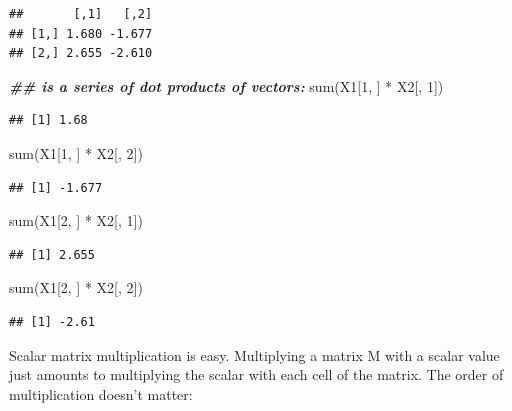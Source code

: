 \documentclass[
  12pt,
]{krantz}
\newenvironment{Shaded}{\begin{snugshade}}{\end{snugshade}}
\newcommand{\DecValTok}[1]{\textcolor[rgb]{0.00,0.00,0.81}{#1}}
\newcommand{\DocumentationTok}[1]{\textcolor[rgb]{0.56,0.35,0.01}{\textbf{\textit{#1}}}}
\newcommand{\FunctionTok}[1]{\textcolor[rgb]{0.00,0.00,0.00}{#1}}
\newcommand{\NormalTok}[1]{#1}
\newcommand{\SpecialCharTok}[1]{\textcolor[rgb]{0.00,0.00,0.00}{#1}}
\theoremstyle{definition}
\theoremstyle{definition}
\theoremstyle{definition}
\theoremstyle{definition}
\theoremstyle{remark}
\begin{document}
\begin{verbatim}
##       [,1]   [,2]
## [1,] 1.680 -1.677
## [2,] 2.655 -2.610
\end{verbatim}

\begin{Shaded}
\begin{Highlighting}[]
\DocumentationTok{\#\# is a series of dot products of vectors:}
\FunctionTok{sum}\NormalTok{(X1[}\DecValTok{1}\NormalTok{, ] }\SpecialCharTok{*}\NormalTok{ X2[, }\DecValTok{1}\NormalTok{])}
\end{Highlighting}
\end{Shaded}

\begin{verbatim}
## [1] 1.68
\end{verbatim}

\begin{Shaded}
\begin{Highlighting}[]
\FunctionTok{sum}\NormalTok{(X1[}\DecValTok{1}\NormalTok{, ] }\SpecialCharTok{*}\NormalTok{ X2[, }\DecValTok{2}\NormalTok{])}
\end{Highlighting}
\end{Shaded}

\begin{verbatim}
## [1] -1.677
\end{verbatim}

\begin{Shaded}
\begin{Highlighting}[]
\FunctionTok{sum}\NormalTok{(X1[}\DecValTok{2}\NormalTok{, ] }\SpecialCharTok{*}\NormalTok{ X2[, }\DecValTok{1}\NormalTok{])}
\end{Highlighting}
\end{Shaded}

\begin{verbatim}
## [1] 2.655
\end{verbatim}

\begin{Shaded}
\begin{Highlighting}[]
\FunctionTok{sum}\NormalTok{(X1[}\DecValTok{2}\NormalTok{, ] }\SpecialCharTok{*}\NormalTok{ X2[, }\DecValTok{2}\NormalTok{])}
\end{Highlighting}
\end{Shaded}

\begin{verbatim}
## [1] -2.61
\end{verbatim}

Scalar matrix multiplication is easy. Multiplying a matrix M with a scalar value just amounts to multiplying the scalar with each cell of the matrix. The order of multiplication doesn't matter:
\end{document}
